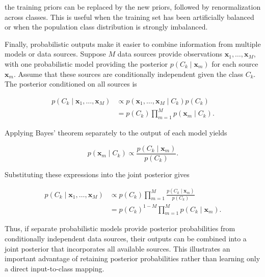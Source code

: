 \documentclass[10pt,twocolumn]{memoir}
\begin{document}
the training priors can be replaced by the new priors, followed by renormalization across classes. This is useful when the training set has been artificially balanced or when the population class distribution is strongly imbalanced.

Finally, probabilistic outputs make it easier to combine information from multiple models or data sources. Suppose $M$ data sources provide observations $\mathbf{x}_1,\ldots,\mathbf{x}_M$, with one probabilistic model providing the posterior $p(C_k\mid\mathbf{x}_m)$ for each source $\mathbf{x}_m$. Assume that these sources are conditionally independent given the class $C_k$. The posterior conditioned on all sources is

\begin{equation}
\begin{aligned}
    p(C_k\mid\mathbf{x}_1,\ldots,\mathbf{x}_M)
    &\propto
    p(\mathbf{x}_1,\ldots,\mathbf{x}_M\mid C_k)p(C_k) \\
    &=
    p(C_k)\prod_{m=1}^{M}p(\mathbf{x}_m\mid C_k).
\end{aligned}
\end{equation}

Applying Bayes' theorem separately to the output of each model yields

\begin{equation}
    p(\mathbf{x}_m\mid C_k)
    \propto
    \frac{p(C_k\mid\mathbf{x}_m)}{p(C_k)}.
\end{equation}

Substituting these expressions into the joint posterior gives

\begin{equation}
\begin{aligned}
    p(C_k\mid\mathbf{x}_1,\ldots,\mathbf{x}_M)
    &\propto
    p(C_k)
    \prod_{m=1}^{M}
    \frac{p(C_k\mid\mathbf{x}_m)}{p(C_k)} \\
    &=
    p(C_k)^{1-M}
    \prod_{m=1}^{M}p(C_k\mid\mathbf{x}_m).
\end{aligned}
\end{equation}

Thus, if separate probabilistic models provide posterior probabilities from conditionally independent data sources, their outputs can be combined into a joint posterior that incorporates all available sources. This illustrates an important advantage of retaining posterior probabilities rather than learning only a direct input-to-class mapping.
\end{document}

